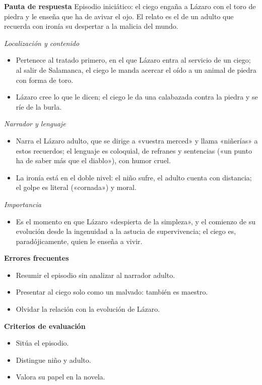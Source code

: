 \documentclass{book}
\begin{document}
\begin{tcolorbox}[title={Ejercicio resuelto}, studiumworked, breakable]
\noindent\textbf{Pauta de respuesta}
Episodio iniciático: el ciego engaña a Lázaro con el toro de piedra y le enseña que ha de avivar el ojo. El relato es el de un adulto que recuerda con ironía su despertar a la malicia del mundo.


\noindent\textit{Localización y contenido}
\begin{itemize}
\item Pertenece al tratado primero, en el que Lázaro entra al servicio de un ciego; al salir de Salamanca, el ciego le manda acercar el oído a un animal de piedra con forma de toro.
\item Lázaro cree lo que le dicen; el ciego le da una calabazada contra la piedra y se ríe de la burla.
\end{itemize}

\noindent\textit{Narrador y lenguaje}
\begin{itemize}
\item Narra el Lázaro adulto, que se dirige a «vuestra merced» y llama «niñerías» a estos recuerdos; el lenguaje es coloquial, de refranes y sentencias («un punto ha de saber más que el diablo»), con humor cruel.
\item La ironía está en el doble nivel: el niño sufre, el adulto cuenta con distancia; el golpe es literal («cornada») y moral.
\end{itemize}

\noindent\textit{Importancia}
\begin{itemize}
\item Es el momento en que Lázaro «despierta de la simpleza», y el comienzo de su evolución desde la ingenuidad a la astucia de supervivencia; el ciego es, paradójicamente, quien le enseña a vivir.
\end{itemize}

\noindent\textbf{Errores frecuentes}
\begin{itemize}
\item Resumir el episodio sin analizar al narrador adulto.
\item Presentar al ciego solo como un malvado: también es maestro.
\item Olvidar la relación con la evolución de Lázaro.
\end{itemize}

\noindent\textbf{Criterios de evaluación}
\begin{itemize}
\item Sitúa el episodio.
\item Distingue niño y adulto.
\item Valora su papel en la novela.
\end{itemize}
\end{tcolorbox}
\end{document}
